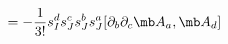 \begin{equation}
[L_3^{(1)},L_1^{(3)}]=- \frac{1}{3!}    s_{I}^{d}s_{J}^{c}  s_{J}^{b}s_{J}^{a}       [\partial_b\partial_c{\mb A}_a, {\mb A}_d]
\end{equation}

